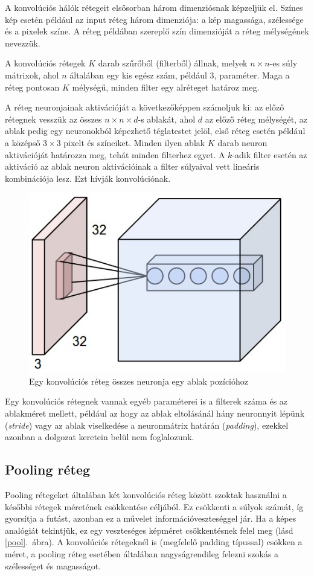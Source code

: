 A konvolúciós hálók rétegeit elsősorban három dimenziósnak képzeljük el. Színes kép esetén például az input réteg három dimenziója: a kép magassága, szélessége és a pixelek színe. A réteg példában szereplő szín dimenzióját a réteg mélységének nevezzük.

A konvolúciós rétegek $K$ darab szűrőből (filterből) állnak, melyek $n\times n$-es súly mátrixok, ahol $n$ általában egy kis egész szám, például 3, paraméter. Maga a réteg pontosan $K$ mélységű, minden filter egy alréteget határoz meg.

A réteg neuronjainak aktivációját a következőképpen számoljuk ki: az előző rétegnek vesszük az összes $n\times n\times d$-s ablakát, ahol $d$ az előző réteg mélységét, az ablak pedig egy neuronokból képezhető téglatestet jelöl, első réteg esetén például a középső $3\times3$ pixelt és színeiket. Minden ilyen ablak $K$ darab neuron aktivációját határozza meg, tehát minden filterhez egyet. A $k$-adik filter esetén az aktiváció az ablak neuron aktivációinak a filter súlyaival vett lineáris kombinációja lesz. Ezt hívják konvolúciónak.

\begin{figure}[h!]
\begin{center}
  \includegraphics[width=0.4\linewidth]{depthcol.jpg}
  \caption{Egy konvolúciós réteg összes neuronja egy ablak pozícióhoz \cite{ConvNet}}
\end{center}
\end{figure}

Egy konvolúciós rétegnek vannak egyéb paraméterei is a filterek száma és az ablakméret mellett, például az hogy az ablak eltolásánál hány neuronnyit lépünk (\emph{stride}) vagy az ablak viselkedése a neuronmátrix határán (\emph{padding}), ezekkel azonban a dolgozat keretein belül nem foglalozunk.

\subsection{Pooling réteg}

Pooling rétegeket általában két konvolúciós réteg között szoktak használni a későbbi rétegek méretének csökkentése céljából. Ez csökkenti a súlyok számát, íg gyorsítja a futást, azonban ez a művelet információveszteséggel jár. Ha a képes analógiát tekintjük, ez egy veszteséges képméret csökkentésnek felel meg (lásd \ref{pool}.~ábra). A konvolúciós rétegeknél is (megfelelő padding típussal) csökken a méret, a pooling réteg esetében általában nagyságrendileg felezni szokás a szélességet és magasságot.


